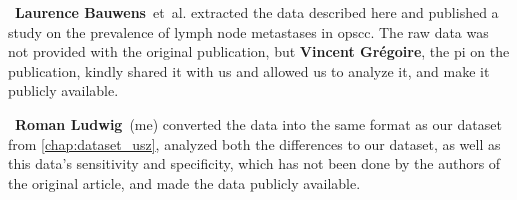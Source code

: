 \begin{tcolorbox}[
    title=\faIcon{users} Contributions,
    parbox=false,
    float
]
    ~\textbf{Laurence Bauwens}~et~al.\cite{bauwens_prevalence_2021} extracted the data described here and published a study on the prevalence of lymph node metastases in \gls{opscc}. The raw data was not provided with the original publication, but  \textbf{Vincent Grégoire}, the \gls{pi} on the publication, kindly shared it with us and allowed us to analyze it, and make it publicly available.

    ~\textbf{Roman Ludwig}~(me) converted the data into the same format as our dataset from \cref{chap:dataset_usz}, analyzed both the differences to our dataset, as well as this data's sensitivity and specificity, which has not been done by the authors of the original article, and made the data publicly available.
\end{tcolorbox}
